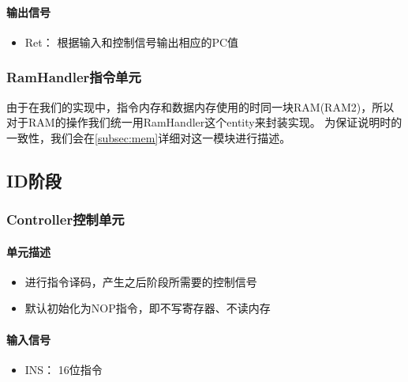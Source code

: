 \documentclass{article}
\begin{document}
\paragraph{输出信号}
\begin{itemize}
\item Ret： 根据输入和控制信号输出相应的PC值
\end{itemize}

\subsubsection{RamHandler指令单元}

由于在我们的实现中，指令内存和数据内存使用的时同一块RAM(RAM2)，所以对于RAM的操作我们统一用RamHandler这个entity来封装实现。
为保证说明时的一致性，我们会在\ref{subsec:mem}详细对这一模块进行描述。

\subsection{ID阶段}

\subsubsection{Controller控制单元}

\paragraph{单元描述}
\begin{itemize}
	\item 进行指令译码，产生之后阶段所需要的控制信号
	\item 默认初始化为NOP指令，即不写寄存器、不读内存 
\end{itemize}

\paragraph{输入信号}
\begin{itemize}
	\item INS： 16位指令 
\end{itemize}
\end{document}
